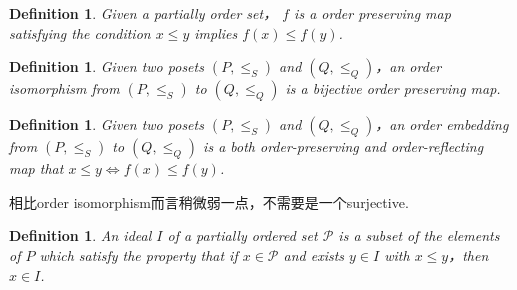 \documentclass{article}
\newtheorem{definition}[theorem]{Definition}
\begin{document}
\begin{center}
\end{center}

\begin{definition}
\rm Given a partially order set， $f$ is a {\color{red} order preserving map} satisfying the condition $x \leq y$ implies $f(x) \leq f(y)$.
\end{definition}

\begin{definition}
\rm Given two posets $(P,\leq_S)$ and $(Q,\leq_Q)$，an {\color{red} order isomorphism} from $(P,\leq_S)$ to $(Q,\leq_Q)$ is a bijective order preserving map.
\end{definition}

\begin{definition}
\rm Given two posets $(P,\leq_S)$ and $(Q,\leq_Q)$，an {\color{red} order embedding} from $(P,\leq_S)$ to $(Q,\leq_Q)$ is a both order-preserving and order-reflecting map that $x \leq y \iff f(x) \leq f(y)$.
\end{definition}

{\color{blue}相比order isomorphism而言稍微弱一点，不需要是一个surjective}.

\begin{definition}
\rm An {\color{red} ideal} $I$ of a partially ordered set $\mathcal{P}$ is a subset of the elements of $P$ which satisfy the property that if $x \in \mathcal{P}$ and exists $y \in I$ with $x \leq y$，then $x \in I$.
\end{definition}
\end{document}
